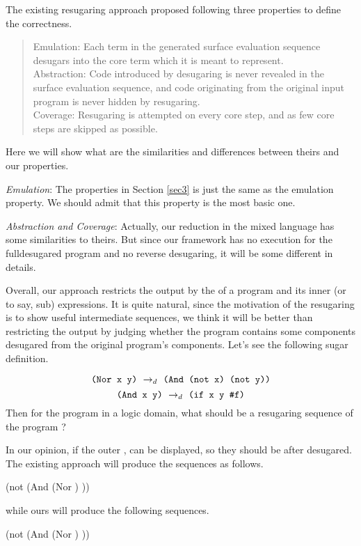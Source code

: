 The existing resugaring approach proposed following three properties to define the correctness.

\begin{quote}
Emulation: 
Each term in the generated surface evaluation sequence desugars into the core term which it is meant to represent.\\
Abstraction: 
Code introduced by desugaring is never revealed in the surface evaluation sequence, and code originating from the original input program is never hidden by resugaring.\\
Coverage: Resugaring is attempted on every core step, and as few core steps are skipped as possible.\\
\end{quote}
Here we will show what are the similarities and differences between theirs and our properties.

\emph{Emulation}: The properties in Section \ref{sec3} is just the same as the emulation property. We should admit that this property is the most basic one.

\emph{Abstraction and Coverage}: Actually, our reduction in the mixed language has some similarities to theirs. But since our framework has no execution for the fulldesugared program and no reverse desugaring, it will be some different in details.

Overall, our approach restricts the output by the  of a program and its inner (or to say, sub) expressions. It is quite natural, since the motivation of the resugaring is to show useful intermediate sequences, we think it will be better than restricting the output by judging whether the program contains some components desugared from the original program's components. Let's see the following sugar definition.

\[
\texttt{(Nor~x~y)} ~\rightarrow_d~ \texttt{(And~(not~x)~(not~y))}
\]
\[
\texttt{(And~x~y)} ~\rightarrow_d~ \texttt{(if~x~y~\#f)}
\]
Then for the program in a logic domain, what should be a resugaring sequence of the program  ?

In our opinion, if the outer ,  can be displayed, so they should be after desugared.
The existing approach will produce the sequences as follows.
\begin{footnotesize}
\begin{Codes}
    (not (And (Nor \false \true) \true))
\OneStep{ \true}
\end{Codes}
\end{footnotesize}
while ours will produce the following sequences.
\begin{footnotesize}
\begin{Codes}
    (not (And (Nor \false \true) \true))
\OneStep{ \true}
\end{Codes}
\end{footnotesize}


